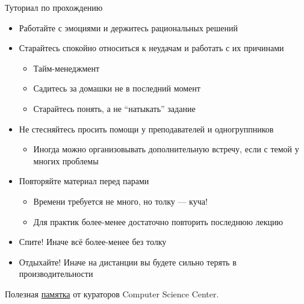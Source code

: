     \begin{frame}{Туториал по прохождению}
        \begin{itemize}
            \item Работайте с эмоциями и держитесь рациональных решений
            \item Старайтесь спокойно относиться к неудачам и работать с их причинами
            \begin{itemize}
                \item Тайм-менеджмент
                \item Садитесь за домашки не в последний момент
                \item Старайтесь понять, а не ``натыкать'' задание
            \end{itemize}
            \item Не стесняйтесь просить помощи у преподавателей и одногруппников
            \begin{itemize}
                \item Иногда можно организовывать дополнительную встречу, если с темой у многих проблемы
            \end{itemize}
            \item Повторяйте материал перед парами
            \begin{itemize}
                \item Времени требуется не много, но толку --- куча!
                \item Для практик более-менее достаточно повторить последнюю лекцию
            \end{itemize}
            \item Спите! Иначе всё более-менее без толку
            \item Отдыхайте! Иначе на дистанции вы будете сильно терять в производительности
        \end{itemize}

        \vspace{1em}
        Полезная \href{https://compscicenter.notion.site/compscicenter/b6dddf00bc7d497298179a3bdbdda375}{\color{blue} памятка} от кураторов Computer Science Center.
    \end{frame}

